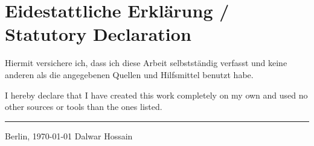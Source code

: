 \chapter*{\LARGE Eidestattliche Erklärung / Statutory Declaration}
Hiermit versichere ich, dass ich diese Arbeit selbst\-ständig verfasst und keine anderen als die angegebenen Quellen und Hilfsmittel benutzt habe.
\vspace{2em}

\noindent I hereby declare that I have created this work completely on my own and used no other sources or tools than the ones listed.

\vspace{30 mm}
\begin{flushright}

\rule{80mm}{1pt}

Berlin, \today \hspace{18 mm} Dalwar Hossain
\end{flushright}
